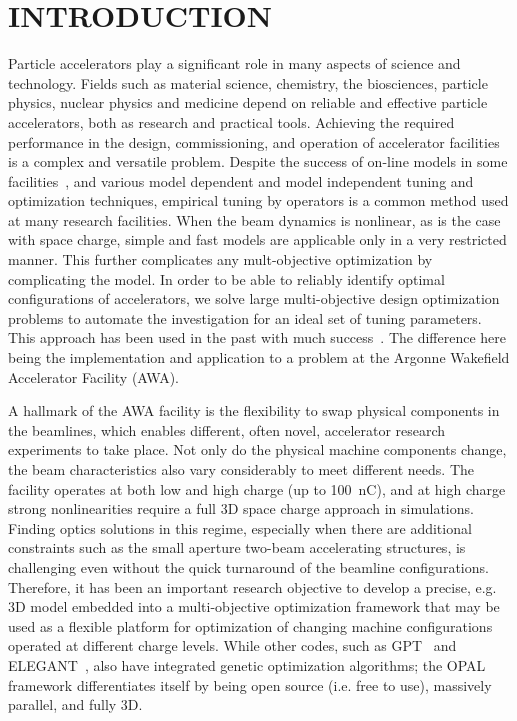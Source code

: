 \documentclass[preprint,linenumbers,amsmath,amssymb,aps,prstab]{revtex4-1}%
\begin{document}
\section{INTRODUCTION} \label{sec:introduction}

Particle accelerators play a significant role in many aspects of science and
  technology.
Fields such as material science, chemistry, the biosciences, particle
  physics, nuclear physics and medicine depend on reliable and effective
  particle accelerators, both as research and practical tools.
Achieving the required performance in the design, commissioning, and operation
  of accelerator facilities is a complex and versatile problem.
Despite the success of on-line models in some facilities~\cite{xiaobiao}, 
and various model dependent and model independent tuning and optimization techniques, 
empirical tuning by operators is a common method used at many research facilities.
When the beam dynamics is nonlinear, as is the case with space charge, 
simple and fast models are applicable only in a very restricted manner. 
This further complicates any mult-objective optimization by complicating the model. 
In order to be able to reliably identify optimal configurations of
  accelerators, we solve large multi-objective design optimization
  problems to automate the investigation for an ideal set of tuning parameters.
  This approach has been used in the past with much 
  success~\cite{bazarov05,yrss:09,chao09,gong12,hofler13,jefferson,gong15,gongthesis15,gull1,gull2,marija}.
The difference here being the implementation and application to a 
problem at the Argonne Wakefield Accelerator Facility (AWA).

A hallmark of the AWA facility is the flexibility to swap physical
components in the beamlines, which enables different, often novel,
accelerator research experiments to take place.  Not only do the
physical machine components change, the beam characteristics also vary
considerably to meet different needs.  The facility operates at both low
and high charge (up to \SI{100}{nC}), and at high charge strong nonlinearities
require a full 3D space charge approach in simulations.  
Finding optics solutions in this regime, especially when
there are additional constraints such as the small aperture two-beam
accelerating structures, is challenging even without the quick
turnaround of the beamline configurations.  Therefore, it has been an
important research objective to develop a precise, e.g. 3D model
embedded into a multi-objective optimization framework that may be used
as a flexible platform for optimization of changing machine
configurations operated at different charge levels. While other codes,
such as GPT~\cite{gpt} and ELEGANT~\cite{elegant}, also have
integrated genetic optimization algorithms; the OPAL~\cite{opal} framework
differentiates itself by being open source (i.e. free to use), massively
parallel, and fully 3D.
\end{document}

